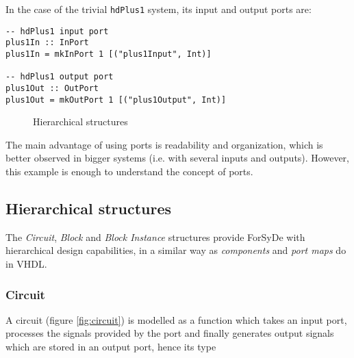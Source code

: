In the case of the trivial \texttt{hdPlus1} system, its input and output
ports are:

\begin{lstlisting}
-- hdPlus1 input port
plus1In :: InPort
plus1In = mkInPort 1 [("plus1Input", Int)]

-- hdPlus1 output port
plus1Out :: OutPort
plus1Out = mkOutPort 1 [("plus1Output", Int)]
\end{lstlisting}


\begin{landscape}
\begin{figure}
\centering
\captionsetup[subfigure]{width=3cm}
\hspace{3.5cm}
\hspace{2cm}
\subfloat[Circuit]{
  
  \label{fig:circuit}
}

\captionsetup[subfigure]{width=3cm}
\subfloat[Block]{
  
  \label{fig:block}
}
\hspace{2.2cm}

\caption{Hierarchical structures}
\label{fig:primderproc}
\end{figure}
\end{landscape}


The main advantage of using ports is readability and organization,
which is better observed in bigger systems (i.e. with several inputs
and outputs).  However, this example is enough to understand the
concept of ports.


\subsection{Hierarchical structures}
The \textit{Circuit}, \textit{Block} and \textit{Block Instance} structures
provide ForSyDe with hierarchical design capabilities, in a similar way as
\textit{components} and \textit{port maps} do in VHDL. 

\subsubsection{Circuit}

A circuit (figure \ref{fig:circuit}) is modelled as a function which takes
an input port, processes the signals provided by the port and finally
generates output signals which are stored in an output port, hence its type

